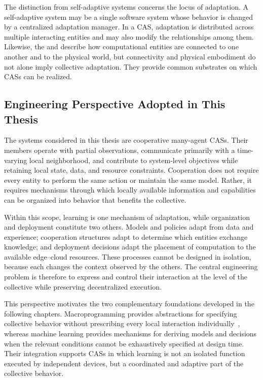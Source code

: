 The distinction from self-adaptive systems concerns the locus of adaptation. 
%
A self-adaptive system may be a single software system 
 whose behavior is changed by a centralized adaptation manager. 
% 
In a \gls{CAS}, 
 adaptation is distributed across multiple interacting entities 
 and may also modify the relationships among them.
%
Likewise, 
 the  and  describe how computational entities are connected 
 to one another and to the physical world, but connectivity and physical embodiment do not alone imply 
 collective adaptation. 
%
They provide common substrates on which \glspl{CAS} can be realized.

\subsection{Engineering Perspective Adopted in This Thesis}
\label{subsec:cas-thesis-perspective}

The systems considered in this thesis are cooperative many-agent \glspl{CAS}. 
%
Their members operate with partial observations, 
 communicate primarily with a time-varying local neighborhood, 
 and contribute to system-level objectives while retaining local state, data, and resource constraints. 
% 
Cooperation does not require every entity to perform the same action or maintain the same model.
%
Rather, 
 it requires mechanisms through which locally available information 
 and capabilities can be organized into behavior that benefits the collective.

Within this scope, 
 learning is one mechanism of adaptation, 
 while organization and deployment constitute two others. 
% 
Models and policies adapt from data and experience; 
 cooperation structures adapt to determine which entities exchange knowledge; 
 and deployment decisions adapt the placement of computation to the available edge--cloud resources. 
% 
These processes cannot be designed in isolation, 
 because each changes the context observed by the others. 
% 
The central engineering problem is therefore to express and control their interaction 
 at the level of the collective while preserving decentralized execution.

This perspective motivates the two complementary foundations developed in the following chapters. 
%
Macroprogramming provides abstractions for specifying collective behavior 
 without prescribing every local interaction individually~\cite{DBLP:journals/csur/Casadei23}, 
 whereas machine learning provides mechanisms for deriving models 
 and decisions when the relevant conditions cannot be exhaustively specified at design time. 
% 
Their integration supports \glspl{CAS} in which learning is not an isolated function executed 
 by independent devices, but a coordinated and adaptive part of the collective behavior.

